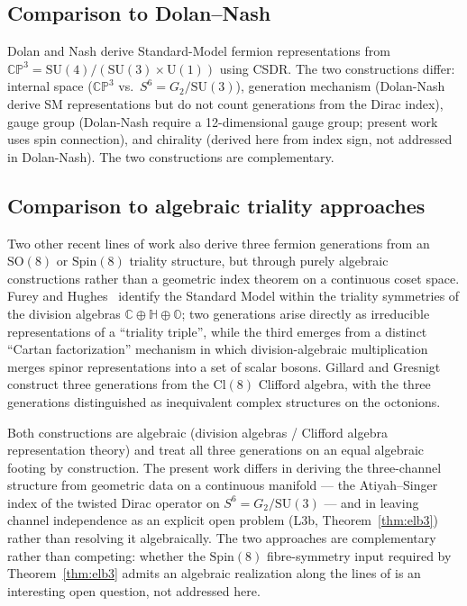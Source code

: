 \documentclass[12pt,a4paper]{article}
\newcommand{\OC}{\mathbb{O}}    %
\newcommand{\CC}{\mathbb{C}}
\newcommand{\HH}{\mathbb{H}}
\begin{document}
\subsection{Comparison to Dolan--Nash \cite{DolanNash2002}}

Dolan and Nash derive Standard-Model fermion representations from
$\mathbb{CP}^3=\mathrm{SU}(4)/(\mathrm{SU}(3)\times\mathrm{U}(1))$ using CSDR. The two
constructions differ: internal space ($\mathbb{CP}^3$ vs.\ $S^6=G_2/\mathrm{SU}(3)$), generation
mechanism (Dolan-Nash derive SM representations but do not count generations from the Dirac
index), gauge group (Dolan-Nash require a 12-dimensional gauge group; present work uses spin
connection), and chirality (derived here from index sign, not addressed in Dolan-Nash). The
two constructions are complementary.

\subsection{Comparison to algebraic triality approaches \cite{FureyHughes2024,GillardGresnigt2019}}

Two other recent lines of work also derive three fermion generations from an $\mathrm{SO}(8)$
or $\mathrm{Spin}(8)$ triality structure, but through purely algebraic constructions rather than
a geometric index theorem on a continuous coset space. Furey and Hughes~\cite{FureyHughes2024}
identify the Standard Model within the triality symmetries of the division algebras
$\CC\oplus\HH\oplus\OC$; two generations arise directly as irreducible representations of a
``triality triple'', while the third emerges from a distinct ``Cartan factorization'' mechanism
in which division-algebraic multiplication merges spinor representations into a set of scalar
bosons. Gillard and Gresnigt~\cite{GillardGresnigt2019} construct three generations from the
$\mathrm{Cl}(8)$ Clifford algebra, with the three generations distinguished as inequivalent
complex structures on the octonions.

Both constructions are algebraic (division algebras / Clifford algebra representation theory)
and treat all three generations on an equal algebraic footing by construction. The present work
differs in deriving the three-channel structure from geometric data on a continuous
manifold --- the Atiyah--Singer index of the twisted Dirac operator on $S^6=G_2/\mathrm{SU}(3)$
--- and in leaving channel independence as an explicit open problem (L3b, Theorem~\ref{thm:elb3})
rather than resolving it algebraically. The two approaches are complementary rather than
competing: whether the $\mathrm{Spin}(8)$ fibre-symmetry input required by
Theorem~\ref{thm:elb3} admits an algebraic realization along the lines of
\cite{FureyHughes2024,GillardGresnigt2019} is an interesting open question, not addressed here.
\end{document}
